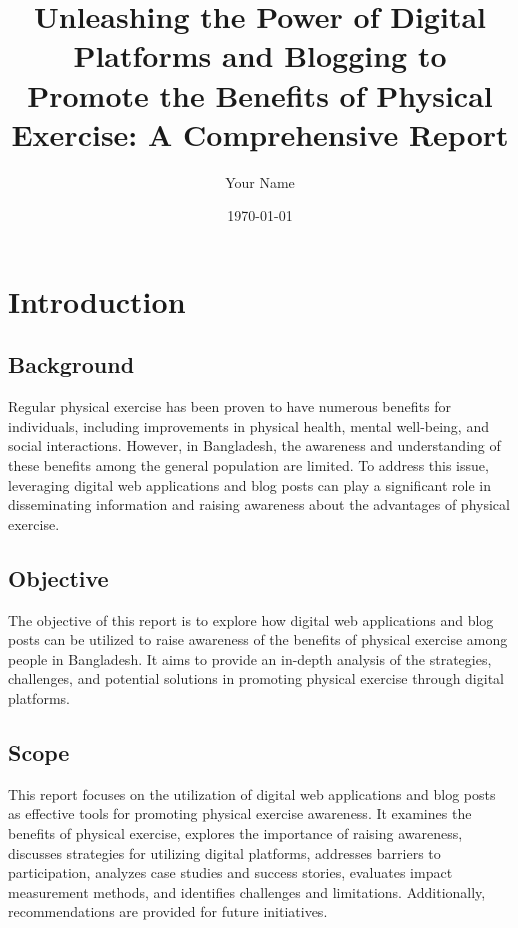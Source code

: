 \documentclass{article}
\begin{document}
\title{Unleashing the Power of Digital Platforms and Blogging to Promote the Benefits of Physical Exercise: A Comprehensive Report}
\author{Your Name}
\date{\today}

\maketitle

\section{Introduction}
\subsection{Background}
Regular physical exercise has been proven to have numerous benefits for individuals, including improvements in physical health, mental well-being, and social interactions. However, in Bangladesh, the awareness and understanding of these benefits among the general population are limited. To address this issue, leveraging digital web applications and blog posts can play a significant role in disseminating information and raising awareness about the advantages of physical exercise.

\subsection{Objective}
The objective of this report is to explore how digital web applications and blog posts can be utilized to raise awareness of the benefits of physical exercise among people in Bangladesh. It aims to provide an in-depth analysis of the strategies, challenges, and potential solutions in promoting physical exercise through digital platforms.

\subsection{Scope}
This report focuses on the utilization of digital web applications and blog posts as effective tools for promoting physical exercise awareness. It examines the benefits of physical exercise, explores the importance of raising awareness, discusses strategies for utilizing digital platforms, addresses barriers to participation, analyzes case studies and success stories, evaluates impact measurement methods, and identifies challenges and limitations. Additionally, recommendations are provided for future initiatives.
\end{document}
